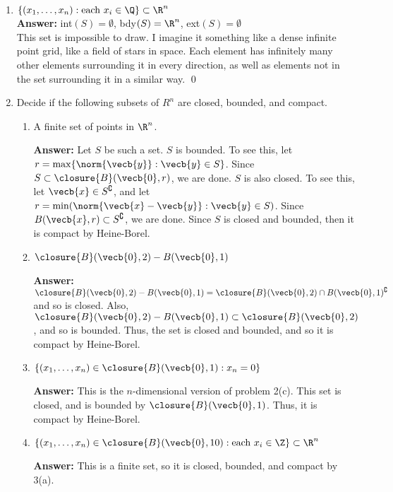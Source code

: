 \documentclass[a5paper]{article}
\theoremstyle{definition}%
\numberwithin{exercise}{section}
\theoremstyle{remark}%
\begin{document}
\begin{enumerate}
	\item $\{(x_1, \ldots, x_n): \text{each } x_i\in\Q\}\subset \R^n$\\
	\textbf{Answer:} int$(S) = \emptyset$, bdy$(S) = \R^n$, ext$(S) = \emptyset$\\
	This set is impossible to draw. I imagine it something like a dense infinite point grid, like a field of stars in space. Each element has infinitely many other elements surrounding it in every direction, as well as elements not in the set surrounding it in a similar way. \qed


\item  Decide if the following subsets of $R^n$ are closed, bounded, and compact.
	\begin{enumerate}[label=(\alph*)]
	\item A finite set of points in $\R^n$.
	
	\textbf{Answer:} Let $S$ be such a set. $S$ is bounded. To see this, let $r=\max\{\norm{\vecb{y}}:\vecb{y}\in S\}$. Since $S\subset \closure{B}(\vecb{0},r)$, we are done. $S$ is also closed. To see this, let $\vecb{x}\in S^\complement$, and let $r=\min(\norm{\vecb{x}-\vecb{y}}:\vecb{y}\in S)$. Since $B(\vecb{x},r)\subset S^\complement$, we are done. Since $S$ is closed and bounded, then it is compact by Heine-Borel.
	
	\item $\closure{B}(\vecb{0},2)-B(\vecb{0},1)$
	
	\textbf{Answer:} $\closure{B}(\vecb{0},2)-B(\vecb{0},1) = \closure{B}(\vecb{0},2)\cap B(\vecb{0},1)^\complement$ and so is closed. Also, $\closure{B}(\vecb{0},2)-B(\vecb{0},1)\subset\closure{B}(\vecb{0},2)$, and so is bounded. Thus, the set is closed and bounded, and so it is compact by Heine-Borel. 
	
	\item $\{(x_1, \ldots, x_n)\in\closure{B}(\vecb{0},1):x_n = 0\}$
	
	\textbf{Answer:} This is the $n$-dimensional version of problem 2(c). This set is closed, and is bounded by $\closure{B}(\vecb{0},1)$. Thus, it is compact by Heine-Borel.
	
	\item $\{(x_1, \ldots, x_n)\in\closure{B}(\vecb{0},10): \text{each }x_i\in \Z\}\subset \R^n$ 
	
	\textbf{Answer:} This is a finite set, so it is closed, bounded, and compact by 3(a).
	

\end{enumerate}
\end{enumerate}
\end{document}
